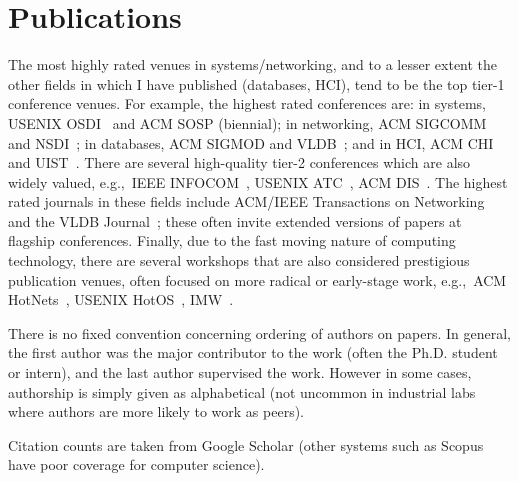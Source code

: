 \documentclass[11pt]{article}
\begin{document}
\part*{Publications}

The most highly rated venues in systems/networking, and to a lesser extent the other fields in which I have published (databases, HCI), tend to be the top tier-1 conference venues. For example, the highest rated conferences are: in systems, USENIX OSDI~\cite{barham04:using.magpie} and ACM SOSP (biennial); in networking, ACM SIGCOMM~\cite{karagiannis08:networ} and NSDI~\cite{cooke06:dark.oracl}; in databases, ACM SIGMOD and VLDB~\cite{narayanan06:delay.seaweed}; and in HCI, ACM CHI and UIST~\cite{mortier12:homew}. There are several high-quality tier-2 conferences which are also widely valued, e.g.,~IEEE INFOCOM~\cite{kosta12:think}, USENIX ATC~\cite{cooke06:reclaim}, ACM DIS~\cite{crabtree12:unrem.networ}. The highest rated journals in these fields include ACM/IEEE Transactions on Networking~\cite{fay10:weigh.spect.distr.inter.topol.analy} and the VLDB Journal~\cite{narayanan08:delay.seaweed}; these often invite extended versions of papers at flagship conferences. Finally, due to the fast moving nature of computing technology, there are several workshops that are also considered prestigious publication venues, often focused on more radical or early-stage work, e.g.,~ACM HotNets~\cite{bahl06:discov.depen.networ.manag,roscoe02:predic.routin}, USENIX HotOS~\cite{barham03:magpie,stratford99:econom.approac.adapt.resour.manag}, IMW~\cite{hengartner02:routin.loops,iannacone02:analy.link.failur.ip.backb}.

There is no fixed convention concerning ordering of authors on papers. In general, the first author was the major contributor to the work (often the Ph.D. student or intern), and the last author supervised the work. However in some cases, authorship is simply given as alphabetical (not uncommon in industrial labs where authors are more likely to work as peers).

Citation counts are taken from Google Scholar (other systems such as Scopus have poor coverage for computer science).

{





}
\end{document}
